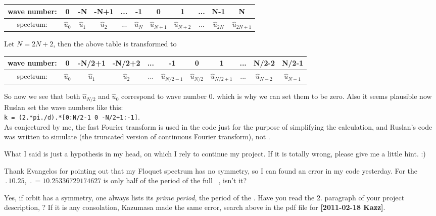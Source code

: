\begin{description}
\begin{tabular}{c || c | c | c | c | c | c | c | c | c | c }
\hline
 wave number:& 0 & -N & -N+1 & ... & -1 & 0 & 1 & ... & N-1  & N \\ \hline
 spectrum:   & $\hat{u}_{0}$ & $\hat{u}_{1}$ & $\hat{u}_{2}$ & ... &
 $\hat{u}_{N}$ & $\hat{u}_{N+1}$ & $\hat{u}_{N+2}$ & ... & $\hat{u}_{2N}$ & $\hat{u}_{2N+1}$ \\
\hline
 \end{tabular}

 Let $N=2N+2$, then the above table is transformed to

\begin{tabular}{c || c | c | c | c | c | c | c | c | c | c }
\hline
 wave number:& 0 & -N/2+1 & -N/2+2 & ... & -1 & 0 & 1 & ... & N/2-2  & N/2-1 \\ \hline
 spectrum:   & $\hat{u}_{0}$ & $\hat{u}_{1}$ & $\hat{u}_{2}$ & ... & $\hat{u}_{N/2-1}$ &
 $\hat{u}_{N/2}$ & $\hat{u}_{N/2+1}$ & ... & $\hat{u}_{N-2}$ & $\hat{u}_{N-1}$ \\
\hline
 \end{tabular}


So now we see that both $\hat{u}_{N/2}$ and $\hat{u}_{0}$ correspond
to wave number $0$. which is
why we can set them to be zero. Also it seems plausible now
Ruslan set the wave numbers like this: \\
\texttt{k = (2.*pi./d).*[0:N/2-1 0 -N/2+1:-1]}.\\
As conjectured by me, the fast Fourier transform is used in the code just
for the purpose of simplifying the
calculation, and Ruslan's code was written to simulate 
(the truncated version of
continuous Fourier transform), not .

What I said is just a hypothesis in my head, on which I rely to continue my project. If it is
totally wrong, please give me a little hint. :)

\item[2013-08-01 \XD] Thank Evangelos for pointing out that
my Floquet spectrum has no symmetry, so I can found an error in
my code yesterday. For the \po\ $\period{10.25}$,
$\period{}=10.25336729174627$ is
only half of the period of the full \statesp\ \po, isn't it?

\item[2013-08-02 Predrag to Xiong] Yes, if orbit has a symmetry, one
always lists its \emph{prime period}, the period of the \rpo. Have you
read the 2. paragraph of your project description,
? If it is any consolation, Kazumasa made the
same error, search  above in the pdf file for {\bf [2011-02-18 Kazz]}.


\end{description}
